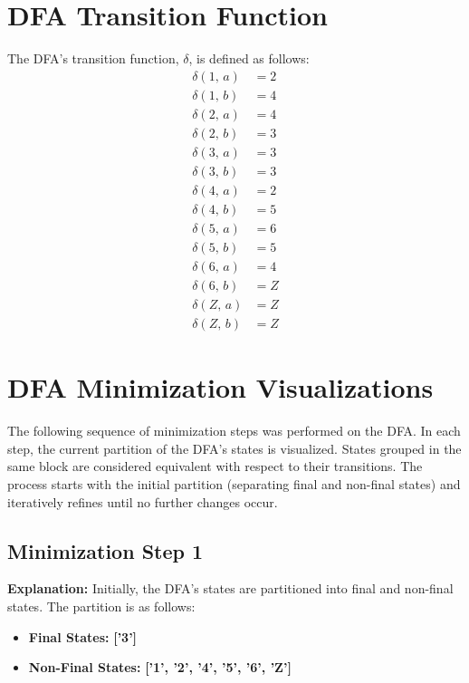\documentclass{article}
\begin{document}
\section{DFA Transition Function}

The DFA's transition function, $\delta$, is defined as follows:
\begin{align*}\delta(1,\,a) &= 2\\[0.5em]\delta(1,\,b) &= 4\\[1em]\delta(2,\,a) &= 4\\[0.5em]\delta(2,\,b) &= 3\\[1em]\delta(3,\,a) &= 3\\[0.5em]\delta(3,\,b) &= 3\\[1em]\delta(4,\,a) &= 2\\[0.5em]\delta(4,\,b) &= 5\\[1em]\delta(5,\,a) &= 6\\[0.5em]\delta(5,\,b) &= 5\\[1em]\delta(6,\,a) &= 4\\[0.5em]\delta(6,\,b) &= Z\\[1em]\delta(Z,\,a) &= Z\\[0.5em]\delta(Z,\,b) &= Z
\end{align*}

\section{DFA Minimization Visualizations}

The following sequence of minimization steps was performed on the DFA. In each step, the current partition of the DFA's states is visualized. States grouped in the same block are considered equivalent with respect to their transitions. The process starts with the initial partition (separating final and non-final states) and iteratively refines until no further changes occur.
\subsection*{Minimization Step 1}
\textbf{Explanation:}
\newline Initially, the DFA's states are partitioned into final and non-final states. The partition is as follows:
\begin{itemize}
    \item \textbf{Final States:} \textbf{ ['3'] }
    \item \textbf{Non-Final States:} \textbf{ ['1', '2', '4', '5', '6', 'Z'] }
\end{itemize}
\end{document}
